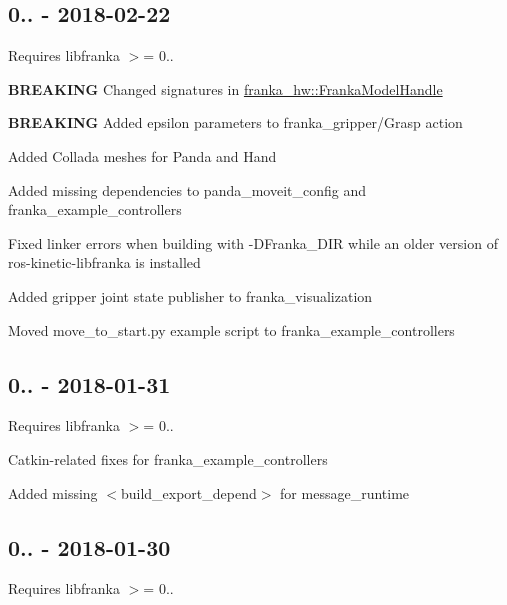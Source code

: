 \subsection*{0.. -\/ 2018-\/02-\/22}

Requires {\ttfamily libfranka} $>$= 0..


\begin{DoxyItemize}
\item {\bfseries B\+R\+E\+A\+K\+I\+NG} Changed signatures in {\ttfamily \hyperlink{classfranka__hw_1_1_franka_model_handle}{franka\+\_\+hw\+::\+Franka\+Model\+Handle}}
\item {\bfseries B\+R\+E\+A\+K\+I\+NG} Added epsilon parameters to {\ttfamily franka\+\_\+gripper/\+Grasp} action
\item Added Collada meshes for Panda and Hand
\item Added missing dependencies to {\ttfamily panda\+\_\+moveit\+\_\+config} and {\ttfamily franka\+\_\+example\+\_\+controllers}
\item Fixed linker errors when building with {\ttfamily -\/\+D\+Franka\+\_\+\+D\+IR} while an older version of {\ttfamily ros-\/kinetic-\/libfranka} is installed
\item Added gripper joint state publisher to {\ttfamily franka\+\_\+visualization}
\item Moved {\ttfamily move\+\_\+to\+\_\+start.\+py} example script to {\ttfamily franka\+\_\+example\+\_\+controllers}
\end{DoxyItemize}

\subsection*{0.. -\/ 2018-\/01-\/31}

Requires {\ttfamily libfranka} $>$= 0..


\begin{DoxyItemize}
\item Catkin-\/related fixes for {\ttfamily franka\+\_\+example\+\_\+controllers}
\item Added missing {\ttfamily $<$build\+\_\+export\+\_\+depend$>$} for {\ttfamily message\+\_\+runtime}
\end{DoxyItemize}

\subsection*{0.. -\/ 2018-\/01-\/30}

Requires {\ttfamily libfranka} $>$= 0..


